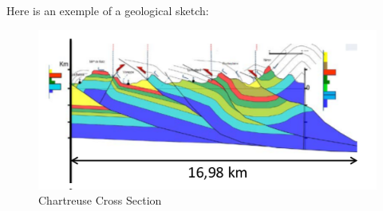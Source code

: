 \documentclass[12pt, a4paper]{memoir} %
\begin{document}
Here is an exemple of a geological sketch: 
\begin{figure}[H]
	\centering
	\includegraphics[scale=0.8]{Wraped_Section.png}
	\caption{Chartreuse Cross Section}
\end{figure}
\end{document}

